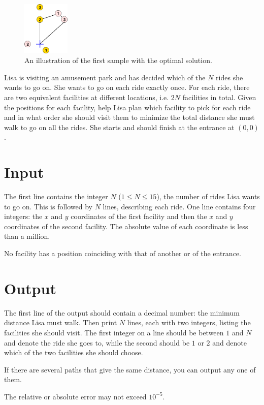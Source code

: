 \begin{figure}[h]
    \centering
    \includegraphics[width=0.2\textwidth]{tivoli}
    \caption{An illustration of the first sample with the optimal solution.}
\end{figure}
Lisa is visiting an amusement park and has decided which of the $N$ rides she wants to go on.
She wants to go on each ride exactly once.
For each ride, there are two equivalent facilities at different locations, i.e. $2N$ facilities in total.
Given the positions for each facility, help Lisa plan which facility to pick for each ride and in what order she should visit them to minimize the total distance she must walk to go on all the rides.
She starts and should finish at the entrance at $(0, 0)$.

\section*{Input}
The first line contains the integer $N$ ($1 \le N \le 15$), the number of rides Lisa wants to go on.
This is followed by $N$ lines, describing each ride.
One line contains four integers: the $x$ and $y$ coordinates of the first facility and then the $x$ and $y$ coordinates of the second facility.
The absolute value of each coordinate is less than a million.

No facility has a position coinciding with that of another or of the entrance.

\section*{Output}
The first line of the output should contain a decimal number: the minimum distance Lisa must walk.
Then print $N$ lines, each with two integers, listing the facilities she should visit.
The first integer on a line should be between $1$ and $N$ and denote the ride she goes to, while the second should be $1$ or $2$ and denote which of the two facilities she should choose.

If there are several paths that give the same distance, you can output any one of them.

The relative or absolute error may not exceed $10^{-5}$.

